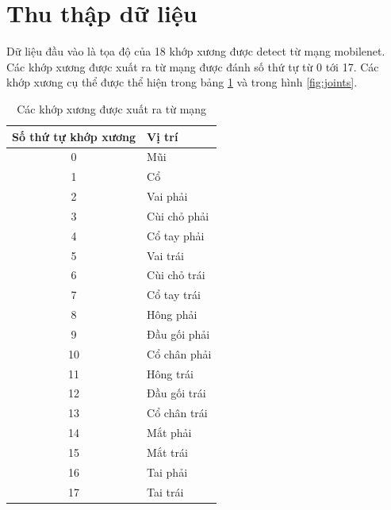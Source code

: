 \section{Thu thập dữ liệu}
Dữ liệu đầu vào là tọa độ của 18 khớp xương được detect từ mạng mobilenet. Các khớp xương được xuất ra từ mạng được đánh số thứ tự từ 0 tới 17. Các khớp xương cụ thể được thể hiện trong bảng \ref{table:joints} và trong hình \ref{fig:joints}.

\FloatBarrier
\begin{table}[h]
\caption{Các khớp xương được xuất ra từ mạng}
\label{table:joints}
\centering
\begin{center}
\begin{tabular}{|c|p{9cm}|} 
 \hline
Số thứ tự khớp xương  & Vị trí \\
 \hline
 0 & Mũi\\
 \hline 
 1 & Cổ\\
 \hline 
 2 & Vai phải\\
 \hline
 3 & Cùi chỏ phải \\
 \hline 
 4 & Cổ tay phải\\
 \hline
 5 & Vai trái\\
 \hline
 6 & Cùi chỏ trái\\
 \hline
 7 & Cổ tay trái\\
 \hline
 8 & Hông phải\\
 \hline
 9 & Đầu gối phải\\
 \hline
 10 & Cổ chân phải\\
 \hline
 11 & Hông trái\\
 \hline
 12 & Đầu gối trái\\
 \hline
 13 & Cổ chân trái\\
 \hline
 14 & Mắt phải\\
 \hline
 15 & Mắt trái\\
 \hline
 16 & Tai phải\\
 \hline
 17 & Tai trái\\
 \hline
\end{tabular}
\end{center}
\end{table}
\FloatBarrier

